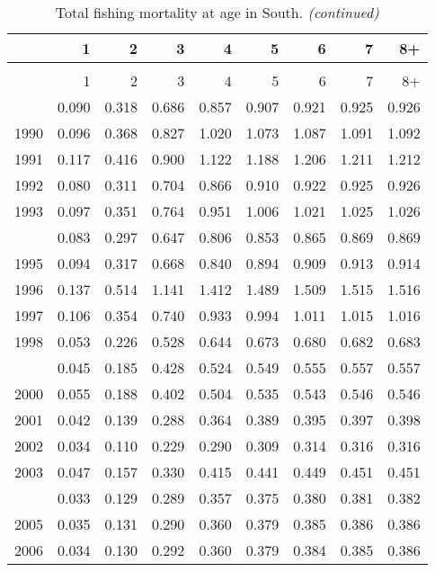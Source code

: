 \documentclass[
]{article}
\begin{document}
\begin{longtable}[t]{lrrrrrrrr}
\caption{\label{tab:South-region-FAA-table}Total fishing mortality at age in South.}\\
\toprule
  & 1 & 2 & 3 & 4 & 5 & 6 & 7 & 8+\\
\midrule
\endfirsthead
\caption[]{Total fishing mortality at age in South. \textit{(continued)}}\\
\toprule
  & 1 & 2 & 3 & 4 & 5 & 6 & 7 & 8+\\
\midrule
\endhead

\endfoot
\bottomrule
\endlastfoot
1989 & 0.090 & 0.318 & 0.686 & 0.857 & 0.907 & 0.921 & 0.925 & 0.926\\
1990 & 0.096 & 0.368 & 0.827 & 1.020 & 1.073 & 1.087 & 1.091 & 1.092\\
1991 & 0.117 & 0.416 & 0.900 & 1.122 & 1.188 & 1.206 & 1.211 & 1.212\\
1992 & 0.080 & 0.311 & 0.704 & 0.866 & 0.910 & 0.922 & 0.925 & 0.926\\
1993 & 0.097 & 0.351 & 0.764 & 0.951 & 1.006 & 1.021 & 1.025 & 1.026\\
\addlinespace
1994 & 0.083 & 0.297 & 0.647 & 0.806 & 0.853 & 0.865 & 0.869 & 0.869\\
1995 & 0.094 & 0.317 & 0.668 & 0.840 & 0.894 & 0.909 & 0.913 & 0.914\\
1996 & 0.137 & 0.514 & 1.141 & 1.412 & 1.489 & 1.509 & 1.515 & 1.516\\
1997 & 0.106 & 0.354 & 0.740 & 0.933 & 0.994 & 1.011 & 1.015 & 1.016\\
1998 & 0.053 & 0.226 & 0.528 & 0.644 & 0.673 & 0.680 & 0.682 & 0.683\\
\addlinespace
1999 & 0.045 & 0.185 & 0.428 & 0.524 & 0.549 & 0.555 & 0.557 & 0.557\\
2000 & 0.055 & 0.188 & 0.402 & 0.504 & 0.535 & 0.543 & 0.546 & 0.546\\
2001 & 0.042 & 0.139 & 0.288 & 0.364 & 0.389 & 0.395 & 0.397 & 0.398\\
2002 & 0.034 & 0.110 & 0.229 & 0.290 & 0.309 & 0.314 & 0.316 & 0.316\\
2003 & 0.047 & 0.157 & 0.330 & 0.415 & 0.441 & 0.449 & 0.451 & 0.451\\
\addlinespace
2004 & 0.033 & 0.129 & 0.289 & 0.357 & 0.375 & 0.380 & 0.381 & 0.382\\
2005 & 0.035 & 0.131 & 0.290 & 0.360 & 0.379 & 0.385 & 0.386 & 0.386\\
2006 & 0.034 & 0.130 & 0.292 & 0.360 & 0.379 & 0.384 & 0.385 & 0.386\\

\end{longtable}
\end{document}
